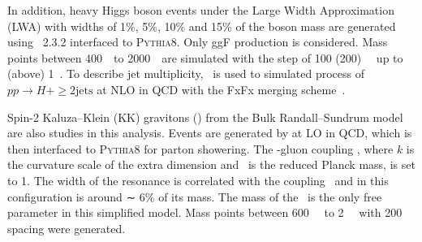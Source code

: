 In addition, heavy Higgs boson events under the Large Width Approximation (LWA) with widths of 1\%, 5\%, 10\% and 15\% of the boson mass are generated using \MGMCatNLO~2.3.2 interfaced to \textsc{Pythia8}.
Only ggF production is considered.
Mass points between 400~\gev~to 2000~\gev~are simulated with the step of 100 (200)~\gev~ up to (above) 1~\tev.
To describe jet multiplicity, \MGMCatNLO~is used to simulated process of $pp\to H + \geq2\text{jets}$ at NLO in QCD with the FxFx merging scheme~\cite{Frederix2012}.

Spin-2 Kaluza–Klein (KK) gravitons (\Graviton) from the Bulk Randall–Sundrum model~\cite{graviton} are also studies in this analysis.
Events are generated by \MGMCatNLO at LO in QCD, which is then interfaced to \textsc{Pythia8} for parton showering.
The \Graviton-gluon coupling \kOverMpl, where $k$ is the curvature scale of the extra dimension and \Mpl~is the reduced Planck mass, is set to 1.
The width of the resonance is correlated with the coupling \kOverMpl~and in this configuration is around ∼ 6\% of its mass. 
The mass of the \Graviton~is the only free parameter in this simplified model.
Mass points between 600~\gev~ to 2~\tev~ with 200~\gev~ spacing were generated.
